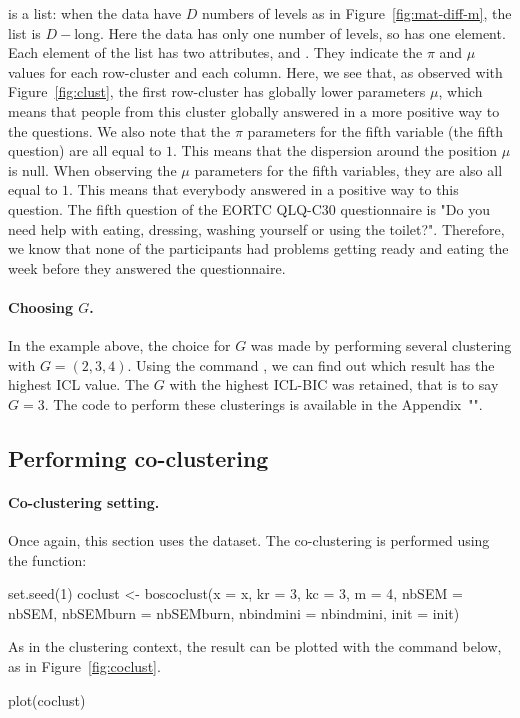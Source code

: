 \noindent {} is a list: when the data have $D$ numbers of levels as in Figure~\ref{fig:mat-diff-m}, the list is $D-$long. Here the data has only one number of levels, so  has one element. Each element of the list has two attributes,  and . They indicate the $\pi$ and $\mu$ values for each row-cluster and each column. Here, we see that, as observed with Figure~\ref{fig:clust}, the first row-cluster has globally lower parameters $\mu$, which means that people from this cluster globally answered in a more positive way to the questions. We also note that the $\pi$ parameters for the fifth variable (the fifth question) are all equal to $1$. This means that the dispersion around the position $\mu$ is null. When observing the $\mu$ parameters for the fifth variables, they are also all equal to $1$. This means that everybody answered in a positive way to this question. The fifth question of the EORTC QLQ-C30 questionnaire is "Do you need help with eating, dressing, washing yourself or using the toilet?". Therefore, we know that none of the participants had problems getting ready and eating the week before they answered the questionnaire.

\paragraph{Choosing $G$.} 
In the example above, the choice for $G$ was made by performing several clustering with $G=(2,3,4)$. Using the command , we can find out which result has the highest ICL value. The $G$ with the highest ICL-BIC was retained, that is to say $G=3$. The code to perform these clusterings is available in the Appendix~"".
  

\subsection{Performing co-clustering}
\label{sec:appli-coclust}

\paragraph{Co-clustering setting.} Once again, this section uses the  dataset. The co-clustering is performed using the  function:
\begin{example}
set.seed(1)
coclust <- boscoclust(x = x, kr = 3, kc = 3, m = 4,
                nbSEM = nbSEM, nbSEMburn = nbSEMburn,
                nbindmini = nbindmini, init = init)
\end{example}
\noindent As in the clustering context, the result can be plotted with the command below, as in Figure~\ref{fig:coclust}.
\begin{example}
plot(coclust)
\end{example}


